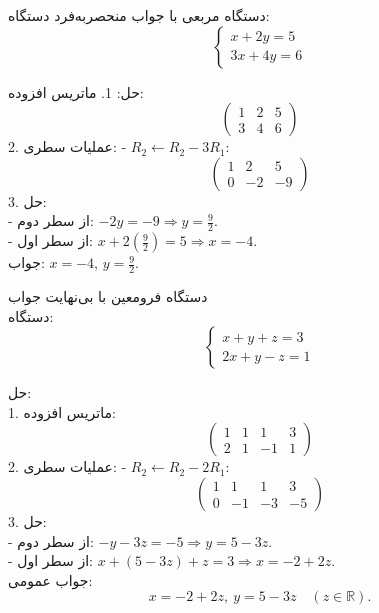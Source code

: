 \begin{example}[]
	دستگاه مربعی با جواب منحصربه‌فرد
	دستگاه:
	\[
	\begin{cases}
		x + 2y = 5 \\
		3x + 4y = 6
	\end{cases}
	\]
	
	حل:
	1. ماتریس افزوده:
	\[
	\left(
	\begin{array}{cc|c}
		1 & 2 & 5 \\
		3 & 4 & 6
	\end{array}
	\right)
	\]
	2. عملیات سطری:
	- \( R_2 \leftarrow R_2 - 3R_1 \):
	\[
	\left(
	\begin{array}{cc|c}
		1 & 2 & 5 \\
		0 & -2 & -9
	\end{array}
	\right)
	\]
	3. حل:\\
	- از سطر دوم: \(-2y = -9 \Rightarrow y = \frac{9}{2}\).\\
	- از سطر اول: \(x + 2(\frac{9}{2}) = 5 \Rightarrow x = -4\).\\
	
	جواب: \( x = -4 \), \( y = \frac{9}{2} \).
\end{example}
\begin{example}[]
دستگاه فرومعین با بی‌نهایت جواب\\
دستگاه:
\[
\begin{cases}
	x + y + z = 3 \\
	2x + y - z = 1
\end{cases}
\]

حل:\\
1. ماتریس افزوده:
\[
\left(
\begin{array}{ccc|c}
	1 & 1 & 1 & 3 \\
	2 & 1 & -1 & 1
\end{array}
\right)
\]
2. عملیات سطری:
- \( R_2 \leftarrow R_2 - 2R_1 \):
\[
\left(
\begin{array}{ccc|c}
	1 & 1 & 1 & 3 \\
	0 & -1 & -3 & -5
\end{array}
\right)
\]
3. حل:\\
- از سطر دوم: \(-y - 3z = -5 \Rightarrow y = 5 - 3z\).\\
- از سطر اول: \(x + (5 - 3z) + z = 3 \Rightarrow x = -2 + 2z\).\\

جواب عمومی:
\[
x = -2 + 2z, \ y = 5 - 3z \quad (z \in \mathbb{R}).
\]	
\end{example}

